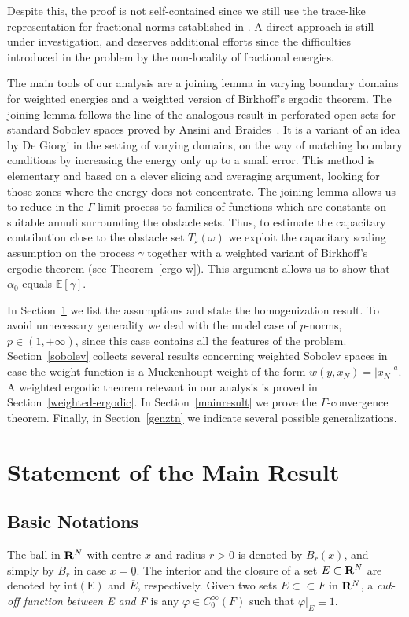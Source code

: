 \documentclass[10pt,reqno]{amsart}
\numberwithin{equation}{section}
\def\R{{\bf R}}
\def\e{\varepsilon}
\def\om{\omega}
\def\xn{x_N}
\begin{document}
Despite this, the proof is not self-contained since we still use
the trace-like representation for fractional norms established
in \cite{Caf-Silv}.
A direct approach is still under investigation, and deserves
additional efforts since the difficulties introduced in the problem
by the non-locality of fractional energies.

The main tools of our analysis are a joining lemma in varying boundary
domains for weighted energies and a weighted version of Birkhoff's
ergodic theorem. The joining lemma follows the line of
the analogous result in perforated open sets
for standard Sobolev spaces proved by Ansini and Braides~\cite{ANB}.
It is a variant of an idea by De Giorgi \cite{DeG} 
in the setting of varying domains, on the way of
matching boundary conditions by increasing the energy only 
up to a small error. This method is elementary and based
on a clever slicing and averaging argument, looking for those zones where
the energy does not concentrate.
The joining lemma allows us to reduce in the $\Gamma$-limit process to
families of functions which are constants on suitable annuli surrounding
the obstacle sets.
Thus, to estimate the capacitary contribution close to the
obstacle set $T_\e(\om)$ we exploit the capacitary scaling
assumption on the process $\gamma$ together with
a weighted variant of Birkhoff's ergodic theorem (see Theorem~\ref{ergo-w}).
This argument allows us to show that $\alpha_0$ equals $\mathbb{E}[\gamma]$.

In Section~\ref{assmptns} we list the assumptions
and state the homogenization result. To avoid unnecessary generality
we deal with the model case of $p$-norms, $p\in(1,+\infty)$, since 
this case contains all the features of the problem.
Section~\ref{sobolev} collects several results concerning weighted
Sobolev spaces in case the weight function is a Muckenhoupt weight
of the form $w(y,\xn)=|\xn|^a$.
A weighted ergodic theorem relevant in our analysis is
proved in Section~\ref{weighted-ergodic}.
In Section~\ref{mainresult} we prove the $\Gamma$-convergence theorem.
Finally, in Section~\ref{genztn} we indicate several possible
generalizations. %

\section{Statement of the Main Result}\label{assmptns}

\subsection{Basic Notations}
The ball in $\R^N$ with centre $x$ and radius $r>0$ is denoted
by $B_r(x)$, and simply by $B_r$ in case $x=\underline{0}$.
The interior and the closure of a set $E\subset\R^N$ are denoted 
by $\mathrm{int(E)}$ and $\overline{E}$, respectively.
Given two sets $E\subset\subset F$ in $\R^N$, a 
\emph{cut-off function between E and F} is any 
$\varphi\in C^\infty_0(F)$ such that $\varphi|_E\equiv 1$. 
\end{document}
